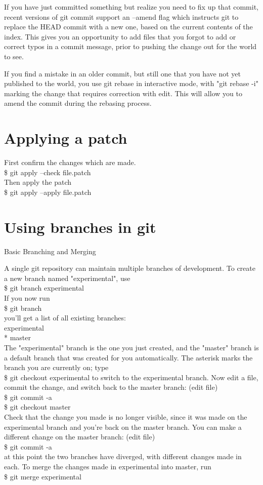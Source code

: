 \documentclass[a4paper,10pt]{article}
\begin{document}
If you have just committed something but realize you need to fix up that commit, recent versions of git commit support an --amend flag which instructs git to replace the HEAD commit with a new one, based on the current contents of the index. This gives you an opportunity to add files that you forgot to add or correct typos in a commit message, prior to pushing the change out for the world to see.

If you find a mistake in an older commit, but still one that you have not yet published to the world, you use git rebase in interactive mode, with "git rebase -i" marking the change that requires correction with edit. This will allow you to amend the commit during the rebasing process.

\section{Applying a patch}
First confirm the changes which are made.\\
\$ git apply --check file.patch\\
Then apply the patch\\
\$ git apply --apply file.patch 

\section{Using branches in git}

Basic Branching and Merging

A single git repository can maintain multiple branches of development. To create a new branch named "experimental", use\\
\$ git branch experimental\\
If you now run\\
\$ git branch\\
you'll get a list of all existing branches:\\
experimental\\
* master\\
	The "experimental" branch is the one you just created, and the "master" branch is a default branch that was created for you automatically. The asterisk marks the branch you are currently on; type\\
\$ git checkout experimental
	to switch to the experimental branch. Now edit a file, commit the change, and switch back to the master branch:
	(edit file)\\
\$ git commit -a\\
\$ git checkout master\\
Check that the change you made is no longer visible, since it was made on the experimental branch and you're back on the master branch.
	You can make a different change on the master branch:
	(edit file)\\
\$ git commit -a\\
at this point the two branches have diverged, with different changes made in each. To merge the changes made in experimental into master, run\\
\$ git merge experimental\\
\end{document}
